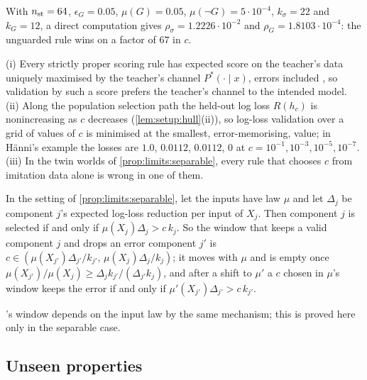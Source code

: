 With $n_{\rm st}=64$, $\epsilon_G=0.05$, $\mu(G)=0.05$, $\mu(\neg G)=5\cdot10^{-4}$, $k_\sigma=22$ and $k_G=12$, a direct computation gives $\rho_\sigma=1.2226\cdot10^{-2}$ and $\rho_G=1.8103\cdot10^{-4}$: the unguarded rule wins on a factor of $67$ in $c$.

\begin{proposition}\label{prop:limits:noident}
(i) Every strictly proper scoring rule has expected score on the teacher's data uniquely maximised by the teacher's channel $P^*(\cdot\mid x)$, errors included \citep{gneiting2007strictly}, so validation by such a score prefers the teacher's channel to the intended model. (ii) Along the population selection path the held-out log loss $R(h_c)$ is nonincreasing as $c$ decreases (\cref{lem:setup:hull}(ii)), so log-loss validation over a grid of values of $c$ is minimised at the smallest, error-memorising, value; in H\"anni's example the losses are $1.0$, $0.0112$, $0.0112$, $0$ at $c=10^{-1},10^{-3},10^{-5},10^{-7}$. (iii) In the twin worlds of \cref{prop:limits:separable}, every rule that chooses $c$ from imitation data alone is wrong in one of them.
\end{proposition}

\begin{proposition}\label{prop:limits:inputlaw}
In the setting of \cref{prop:limits:separable}, let the inputs have law $\mu$ and let $\Delta_j$ be component $j$'s expected log-loss reduction per input of $X_j$. Then component $j$ is selected if and only if $\mu(X_j)\Delta_j>c\,k_j$. So the window that keeps a valid component $j$ and drops an error component $j'$ is $c\in(\mu(X_{j'})\Delta_{j'}/k_{j'},\,\mu(X_j)\Delta_j/k_j)$; it moves with $\mu$ and is empty once $\mu(X_{j'})/\mu(X_j)\ge\Delta_jk_{j'}/(\Delta_{j'}k_j)$, and after a shift to $\mu'$ a $c$ chosen in $\mu$'s window keeps the error if and only if $\mu'(X_{j'})\Delta_{j'}>c\,k_{j'}$.
\end{proposition}

's window depends on the input law by the same mechanism; this is proved here only in the separable case.

\subsection{Unseen properties}\label{sec:limits:ood}

